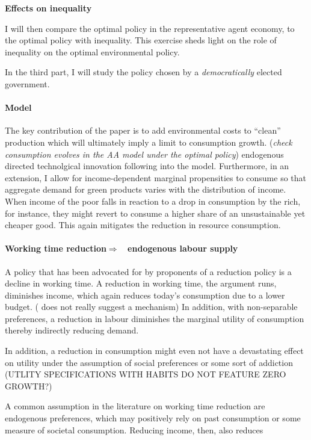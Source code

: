 \documentclass[12pt]{article}
\newcommand{\ar}{$\Rightarrow$ \ }
\begin{document}
\textbf{Effects on inequality}

I will then compare the optimal policy in the representative agent economy, to the optimal policy with inequality. This exercise sheds light on the role of inequality on the optimal environmental policy. 

In the third part, I will study the policy chosen by a \textit{democratically} elected government. 


\paragraph{Model}
The key contribution of the paper is to add environmental costs to ``clean'' production which  will ultimately imply a limit to consumption growth.
  (\textit{check consumption evolves in the AA model under the optimal policy})  
  endogenous directed technolgical innovation following  \cite{Acemoglu2012TheChange} into the model. Furthermore, in an extension, I allow for income-dependent marginal propensities to consume so that aggregate demand for green products varies with the distribution of income. When income of the poor falls in reaction to a drop in consumption by the rich, for instance, they might revert to consume a higher share of an unsustainable yet cheaper good. This again mitigates the reduction in resource consumption. 


 
\paragraph{Working time reduction\ar endogenous labour supply}
A policy that has been advocated for by  proponents of a reduction policy is a decline in working time. A reduction in working time, the argument runs, diminishes income, which again reduces today's consumption due to a lower budget.
(\cite{Schor2005SustainableReduction} does not really suggest a mechanism)
In addition, with non-separable preferences, a reduction in labour diminishes the marginal utility of consumption thereby indirectly reducing demand. 

In addition, a reduction in consumption might even not have a devastating effect on utility under the assumption of social preferences or some sort of addiction (UTLITY SPECIFICATIONS WITH HABITS DO NOT FEATURE ZERO GROWTH?)


A common assumption in the literature on working time reduction are endogenous preferences, which may positively rely on past consumption or some measure of societal consumption. Reducing income, then, also reduces 
\end{document}
